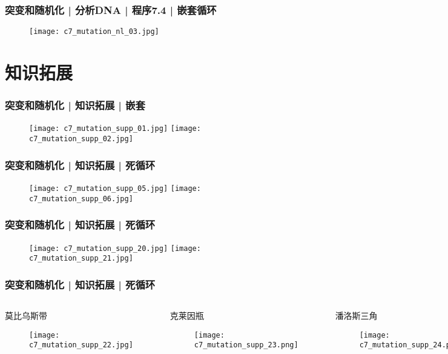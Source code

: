 \begin{frame}
  \frametitle{突变和随机化 | 分析DNA | 程序7.4 | 嵌套循环}
  \begin{figure}
    \centering
    \texttt{[image: c7\_mutation\_nl\_03.jpg]}
  \end{figure}
\end{frame}

\section{知识拓展}
\begin{frame}
  \frametitle{突变和随机化 | 知识拓展 | 嵌套}
  \begin{figure}
    \centering
    \texttt{[image: c7\_mutation\_supp\_01.jpg]}\quad
    \texttt{[image: c7\_mutation\_supp\_02.jpg]}
  \end{figure}
\end{frame}

\begin{frame}
  \frametitle{突变和随机化 | 知识拓展 | 死循环}
  \begin{figure}
    \centering
    \texttt{[image: c7\_mutation\_supp\_05.jpg]}\quad
    \texttt{[image: c7\_mutation\_supp\_06.jpg]}
  \end{figure}
\end{frame}

\begin{frame}
  \frametitle{突变和随机化 | 知识拓展 | 死循环}
  \begin{figure}
    \centering
    \texttt{[image: c7\_mutation\_supp\_20.jpg]}\quad
    \texttt{[image: c7\_mutation\_supp\_21.jpg]}
  \end{figure}
\end{frame}

\begin{frame}
  \frametitle{突变和随机化 | 知识拓展 | 死循环}
  \begin{columns}
    \begin{block}{莫比乌斯带}
      \begin{figure}
        \centering
        \texttt{[image: c7\_mutation\_supp\_22.jpg]}
      \end{figure}
    \end{block}
    \begin{block}{克莱因瓶}
      \begin{figure}
        \centering
        \texttt{[image: c7\_mutation\_supp\_23.png]}
      \end{figure}
    \end{block}
    \begin{block}{潘洛斯三角}
      \begin{figure}
        \centering
        \texttt{[image: c7\_mutation\_supp\_24.png]}
      \end{figure}
    \end{block}
  \end{columns}
\end{frame}


